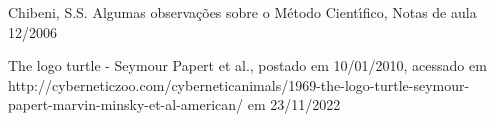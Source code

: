 \documentclass[
12pt,		%
openright,	%
twoside,  %
a4paper,			%
chapter=TITLE,		%
english,			%
french,				%
spanish,			%
brazil				%
]{USPSC-classe/USPSC}
\begin{document}
\begin{flushleft}
\begin{flushleft}
\begin{flushleft}
\begin{flushleft}
\begin{flushleft}
\begin{flushleft}
\begin{flushleft}
\begin{flushleft}
\begin{flushleft}
[CHIBENI, 2006] Chibeni, S.S. Algumas observa\c{c}\~oes sobre o M\'etodo Cient\'{\i}fico, Notas de aula 12/2006
\end{flushleft}


\end{flushleft}


\end{flushleft}


\end{flushleft}


\end{flushleft}


\end{flushleft}


\end{flushleft}


\end{flushleft}


\end{flushleft}


\begin{flushleft}
\begin{flushleft}
\begin{flushleft}
\begin{flushleft}
\begin{flushleft}
\begin{flushleft}
\begin{flushleft}
\begin{flushleft}
\begin{flushleft}
[CIBERNECTZOO, 2010] The logo turtle - Seymour Papert et al., postado em 10/01/2010, acessado em http://cyberneticzoo.com/cyberneticanimals/1969-the-logo-turtle-seymour-papert-marvin-minsky-et-al-american/ em 23/11/2022
\end{flushleft}


\end{flushleft}


\end{flushleft}


\end{flushleft}


\end{flushleft}


\end{flushleft}


\end{flushleft}


\end{flushleft}


\end{flushleft}
\end{document}

